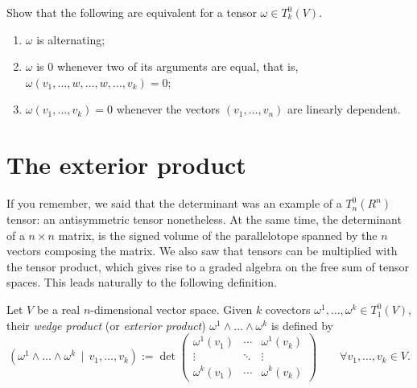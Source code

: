 \begin{exercise}\label{ex:propAlt}
  Show that the following are equivalent for a tensor $\omega\in T_k^0(V)$.
  \begin{enumerate}
    \item $\omega$ is alternating;
    \item $\omega$ is $0$ whenever two of its arguments are equal, that is, ${\omega(v_1, \ldots, w, \ldots, w, \ldots, v_k) = 0}$;
    \item $\omega(v_1, \ldots, v_k) = 0$ whenever the vectors $(v_1, \ldots, v_n)$ are linearly dependent.
  \end{enumerate}
\end{exercise}

\section{The exterior product}

If you remember, we said that the determinant was an example of a $T_n^0(R^n)$ tensor: an antisymmetric tensor nonetheless.
At the same time, the determinant of a $n\times n$ matrix, is the signed volume of the parallelotope spanned by the $n$ vectors composing the matrix.
We also saw that tensors can be multiplied with the tensor product, which gives rise to a graded algebra on the free sum of tensor spaces.
This leads naturally to the following definition.

\begin{definition}
  Let $V$ be a real $n$-dimensional vector space.
  Given $k$ covectors $\omega^1, \ldots, \omega^k\in T_1^0(V)$, their \emph{wedge product} (or \emph{exterior product}) $\omega^1\wedge\ldots\wedge\omega^k$ is defined by
  \begin{equation}
    \left(
      \omega^1\wedge\ldots\wedge\omega^k\,\mid\, v_1,\ldots,v_k
    \right) := \det\begin{pmatrix}
      \omega^1(v_1) & \cdots & \omega^1(v_k) \\
      \vdots & \ddots & \vdots \\
      \omega^k(v_1) & \cdots & \omega^k(v_k)
    \end{pmatrix} \qquad
    \forall v_1,\ldots,v_k\in V.
  \end{equation}
\end{definition}

